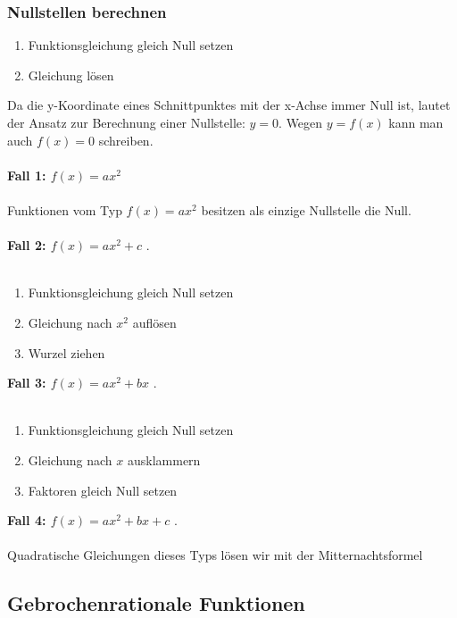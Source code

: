 \begin{multicols}{2}
    \subsubsection{Nullstellen berechnen}
    \begin{enumerate}
        \item Funktionsgleichung gleich Null setzen
        \item Gleichung lösen
    \end{enumerate}
    Da die y-Koordinate eines Schnittpunktes mit der x-Achse immer Null ist, lautet der Ansatz zur Berechnung einer Nullstelle: $y = 0$. Wegen $y = f(x)$ kann man auch $f(x) = 0$ schreiben. \\~\\
    \textbf{Fall 1: $f(x) = ax^2$} \\~\\
    Funktionen vom Typ $f(x) = ax^2$ besitzen als einzige Nullstelle die Null. \\~\\
    \textbf{Fall 2: $f(x) = ax^2 + c$} . \\~\\
    \begin{enumerate}
        \item     Funktionsgleichung gleich Null setzen
        \item     Gleichung nach $x^2$ auflösen
        \item     Wurzel ziehen
    \end{enumerate}

    \textbf{Fall 3: $f(x) = ax^2 + bx$} . \\~\\
    \begin{enumerate}
        \item     Funktionsgleichung gleich Null setzen
        \item     Gleichung nach $x$ ausklammern
        \item     Faktoren gleich Null setzen
    \end{enumerate}

    \textbf{Fall 4: $f(x) = ax^2 + bx + c$} . \\~\\
    Quadratische Gleichungen dieses Typs lösen wir mit der Mitternachtsformel
    \subsection{Gebrochenrationale Funktionen}
    \vspace{-4mm}

\end{multicols}

